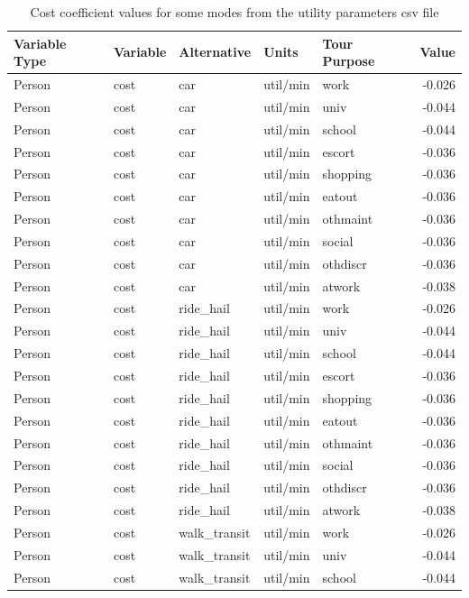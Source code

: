 \documentclass[12pt, oneside, openright]{byuthesis}
\begin{document}
\begin{table}

\caption{\label{tab:asimvals}Cost coefficient values for some modes from the utility parameters csv file}
\centering
\begin{tabular}[t]{lllllr}
\toprule
Variable Type & Variable & Alternative & Units & Tour Purpose & Value\\
\midrule
Person & cost & car & util/min & work & -0.026\\
Person & cost & car & util/min & univ & -0.044\\
Person & cost & car & util/min & school & -0.044\\
Person & cost & car & util/min & escort & -0.036\\
Person & cost & car & util/min & shopping & -0.036\\
\addlinespace
Person & cost & car & util/min & eatout & -0.036\\
Person & cost & car & util/min & othmaint & -0.036\\
Person & cost & car & util/min & social & -0.036\\
Person & cost & car & util/min & othdiscr & -0.036\\
Person & cost & car & util/min & atwork & -0.038\\
\addlinespace
Person & cost & ride\_hail & util/min & work & -0.026\\
Person & cost & ride\_hail & util/min & univ & -0.044\\
Person & cost & ride\_hail & util/min & school & -0.044\\
Person & cost & ride\_hail & util/min & escort & -0.036\\
Person & cost & ride\_hail & util/min & shopping & -0.036\\
\addlinespace
Person & cost & ride\_hail & util/min & eatout & -0.036\\
Person & cost & ride\_hail & util/min & othmaint & -0.036\\
Person & cost & ride\_hail & util/min & social & -0.036\\
Person & cost & ride\_hail & util/min & othdiscr & -0.036\\
Person & cost & ride\_hail & util/min & atwork & -0.038\\
\addlinespace
Person & cost & walk\_transit & util/min & work & -0.026\\
Person & cost & walk\_transit & util/min & univ & -0.044\\
Person & cost & walk\_transit & util/min & school & -0.044\\

\end{tabular}
\end{table}
\end{document}
